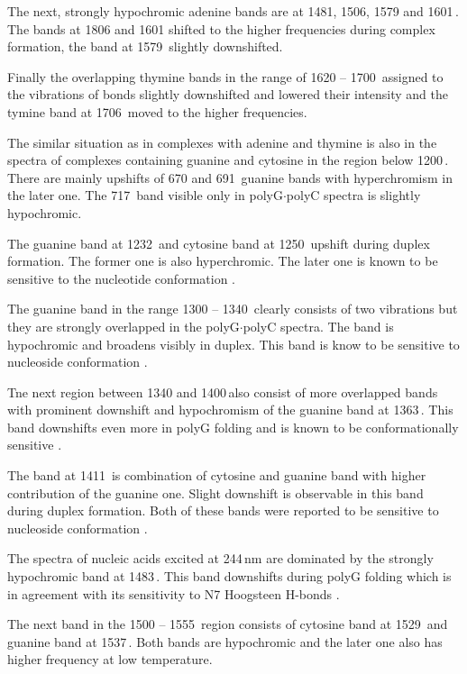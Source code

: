 The next, strongly hypochromic adenine bands are at 1481, 1506, 1579 and
1601\,\icm{}. The bands at 1806 and 1601 shifted to the higher frequencies
during complex formation, the band at 1579\,\icm{} slightly downshifted.

Finally the overlapping thymine bands in the range of 1620 -- 1700\,\icm{}
assigned to the vibrations of  bonds slightly downshifted and lowered
their intensity and the tymine band at 1706\,\icm{} moved to the higher
frequencies.

The similar situation as in complexes with adenine and thymine is also in the
spectra of complexes containing guanine and cytosine in the region below
1200\,\icm{}.
There are mainly upshifts of 670 and 691\,\icm{} guanine bands with
hyperchromism in the later one.
The 717\,\icm{} band visible only in polyG$\cdot$polyC spectra is slightly
hypochromic.

The guanine band at 1232\,\icm{} and cytosine band at 1250\,\icm{} upshift
during duplex formation. The former one is also hyperchromic.
The later one is known to be sensitive to the nucleotide conformation
\parencite{%
	Benevides2005,%
	Hernandez2005%
}.

The guanine band in the range 1300 -- 1340\,\icm{} clearly consists of two
vibrations but they are strongly overlapped in the polyG$\cdot$polyC spectra.
The band is hypochromic and broadens visibly in duplex. This band is know to be
sensitive to nucleoside conformation
\parencite{Benevides2005}.

Tne next region between 1340 and 1400\,\icm also consist of more overlapped
bands with prominent downshift and hypochromism of the guanine band at
1363\,\icm{}.
This band downshifts even more in polyG folding and is known to be
conformationally sensitive
\parencite{Nishimura1986b}.

The band at 1411\,\icm{} is combination of cytosine and guanine band with
higher contribution of the guanine one.
Slight downshift is observable in this band during duplex formation.
Both of these bands were reported to be sensitive to nucleoside conformation
\parencite{Nishimura1986b}.

The spectra of nucleic acids excited at 244\,nm are dominated by the strongly
hypochromic band at 1483\,\icm{}.
This band downshifts during polyG folding which is in agreement with its
sensitivity to N7 Hoogsteen H-bonds
\parencite{Palacky2013}.

The next band in the 1500 -- 1555\,\icm{} region consists of cytosine band at
1529\,\icm{} and guanine band at 1537\,\icm{}. Both bands are hypochromic and
the later one also has higher frequency at low temperature.

